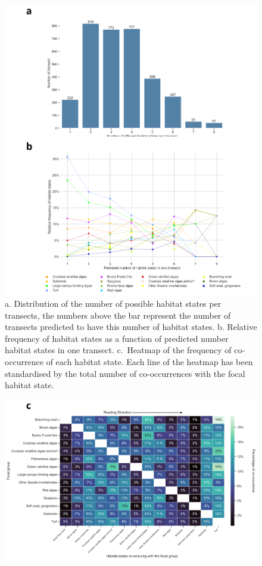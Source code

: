 \begin{refsection}
\begin{figure}
\hypertarget{fig:chap3fig3}{%
\centering
\includegraphics{03-Chapitre3/figures/05-multipanel_fig_ab.png}
\caption{a. Distribution of the number of possible habitat states per
transects, the numbers above the bar represent the number of transects
predicted to have this number of habitat states. b. Relative frequency
of habitat states as a function of predicted number habitat states in
one transect. c.~Heatmap of the frequency of co-occurrence of each
habitat state. Each line of the heatmap has been standardised by the
total number of co-occurrences with the focal habitat
state.}\label{fig:chap3fig3}
}
\end{figure}
\begin{figure}
\ContinuedFloat
\includegraphics{03-Chapitre3/figures/05-multipanel_fig_c.png}

\end{figure}
\end{refsection}
